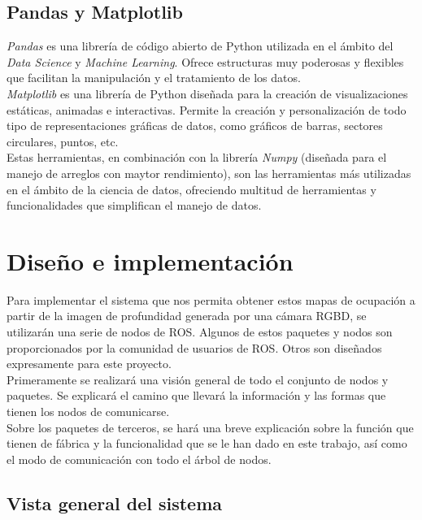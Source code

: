 \section{Pandas y Matplotlib}

\textit{Pandas} es una librería de código abierto de Python utilizada en el ámbito del \textit{Data Science} y \textit{Machine Learning}. Ofrece estructuras muy poderosas y flexibles que facilitan la manipulación y el tratamiento de los datos. \cite{pandas}\\

\textit{Matplotlib} es una librería de Python diseñada para la creación de visualizaciones estáticas, animadas e interactivas. Permite la creación y personalización de todo tipo de representaciones gráficas de datos, como gráficos de barras, sectores circulares, puntos, etc.\cite{matplotlib}\\

Estas herramientas, en combinación con la librería \textit{Numpy} (diseñada para el manejo de arreglos con maytor rendimiento), son las herramientas más utilizadas en el ámbito de la ciencia de datos, ofreciendo multitud de herramientas y funcionalidades que simplifican el manejo de datos.\\



\chapter{Diseño e implementación}

Para implementar el sistema que nos permita obtener estos mapas de ocupación a partir de la imagen de profundidad generada por una cámara RGBD, se utilizarán una serie de nodos de ROS. Algunos de estos paquetes y nodos son proporcionados por la comunidad de usuarios de ROS. Otros son diseñados expresamente para este proyecto.\\

Primeramente se realizará una visión general de todo el conjunto de nodos y paquetes. Se explicará el camino que llevará la información y las formas que tienen los nodos de comunicarse.\\

Sobre los paquetes de terceros, se hará una breve explicación sobre la función que tienen de fábrica y la funcionalidad que se le han dado en este trabajo, así como el modo de comunicación con todo el árbol de nodos.\\

\section{Vista general del sistema}

